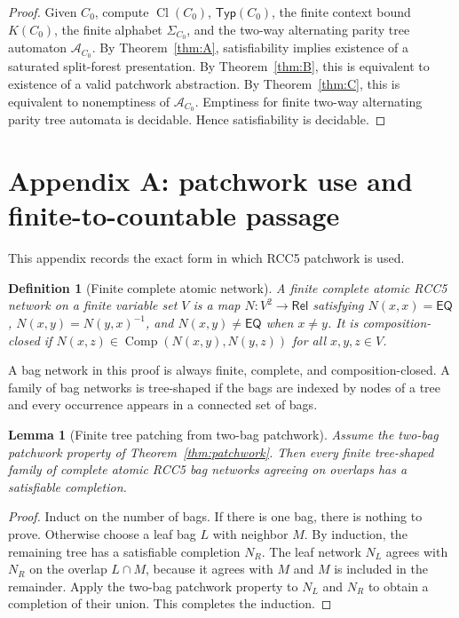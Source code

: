 \documentclass[11pt]{article}
\newtheorem{lemma}[theorem]{Lemma}
\newtheorem{definition}[theorem]{Definition}
\newcommand{\Rel}{\mathsf{Rel}}
\newcommand{\EQ}{\mathsf{EQ}}
\newcommand{\Comp}{\operatorname{Comp}}
\newcommand{\Cl}{\operatorname{Cl}}
\newcommand{\APTA}{\mathcal A}
\newcommand{\Typ}{\mathsf{Typ}}
\begin{document}
\begin{proof}
Given $C_0$, compute $\Cl(C_0)$, $\Typ(C_0)$, the finite context bound $K(C_0)$, the finite alphabet $\Sigma_{C_0}$, and the two-way alternating parity tree automaton $\APTA_{C_0}$.  By Theorem~\ref{thm:A}, satisfiability implies existence of a saturated split-forest presentation.  By Theorem~\ref{thm:B}, this is equivalent to existence of a valid patchwork abstraction.  By Theorem~\ref{thm:C}, this is equivalent to nonemptiness of $\APTA_{C_0}$.  Emptiness for finite two-way alternating parity tree automata is decidable.  Hence satisfiability is decidable.
\end{proof}

\appendix

\section{Appendix A: patchwork use and finite-to-countable passage}\label{app:patchwork}

This appendix records the exact form in which RCC5 patchwork is used.

\begin{definition}[Finite complete atomic network]
A finite complete atomic RCC5 network on a finite variable set $V$ is a map $N:V^2\to\Rel$ satisfying $N(x,x)=\EQ$, $N(x,y)=N(y,x)^{-1}$, and $N(x,y)\ne\EQ$ when $x\ne y$.  It is composition-closed if $N(x,z)\in\Comp(N(x,y),N(y,z))$ for all $x,y,z\in V$.
\end{definition}

A bag network in this proof is always finite, complete, and composition-closed.  A family of bag networks is tree-shaped if the bags are indexed by nodes of a tree and every occurrence appears in a connected set of bags.

\begin{lemma}[Finite tree patching from two-bag patchwork]
Assume the two-bag patchwork property of Theorem~\ref{thm:patchwork}.  Then every finite tree-shaped family of complete atomic RCC5 bag networks agreeing on overlaps has a satisfiable completion.
\end{lemma}

\begin{proof}
Induct on the number of bags.  If there is one bag, there is nothing to prove.  Otherwise choose a leaf bag $L$ with neighbor $M$.  By induction, the remaining tree has a satisfiable completion $N_R$.  The leaf network $N_L$ agrees with $N_R$ on the overlap $L\cap M$, because it agrees with $M$ and $M$ is included in the remainder.  Apply the two-bag patchwork property to $N_L$ and $N_R$ to obtain a completion of their union.  This completes the induction.
\end{proof}
\end{document}

